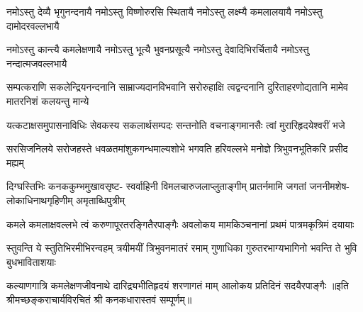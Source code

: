 \fourlineindentedshloka
{नमोऽस्तु देव्यै भृगुनन्दनायै}
{नमोऽस्तु विष्णोरुरसि स्थितायै}
{नमोऽस्तु लक्ष्म्यै कमलालयायै}
{नमोऽस्तु दामोदरवल्लभायै}

\fourlineindentedshloka
{नमोऽस्तु कान्त्यै कमलेक्षणायै}
{नमोऽस्तु भूत्यै भुवनप्रसूत्यै}
{नमोऽस्तु देवादिभिरर्चितायै}
{नमोऽस्तु नन्दात्मजवल्लभायै}

\fourlineindentedshloka
{सम्पत्कराणि सकलेन्द्रियनन्दनानि}
{साम्राज्यदानविभवानि सरोरुहाक्षि}
{त्वद्वन्दनानि दुरिताहरणोद्यतानि}
{मामेव मातरनिशं कलयन्तु मान्ये}

\fourlineindentedshloka
{यत्कटाक्षसमुपासनाविधिः}
{सेवकस्य सकलार्थसम्पदः}
{सन्तनोति वचनाङ्गमानसैः}
{त्वां मुरारिहृदयेश्वरीं भजे}

\fourlineindentedshloka
{सरसिजनिलये सरोजहस्ते}
{धवळतमांशुकगन्धमाल्यशोभे}
{भगवति हरिवल्लभे मनोज्ञे}
{त्रिभुवनभूतिकरि प्रसीद मह्यम्}

\fourlineindentedshloka
{दिग्घस्तिभिः कनककुम्भमुखावसृष्ट-}
{स्वर्वाहिनी विमलचारुजलाप्लुताङ्गीम्}
{प्रातर्नमामि जगतां जननीमशेष-}
{लोकाधिनाथगृहिणीम् अमृताब्धिपुत्रीम्}

\fourlineindentedshloka
{कमले कमलाक्षवल्लभे त्वं}
{करुणापूरतरङ्गितैरपाङ्गैः}
{अवलोकय मामकिञ्चनानां}
{प्रथमं पात्रमकृत्रिमं दयायाः}

\fourlineindentedshloka
{स्तुवन्ति ये स्तुतिभिरमीभिरन्वहम्}
{त्रयीमयीं त्रिभुवनमातरं रमाम्}
{गुणाधिका गुरुतरभाग्यभागिनो}
{भवन्ति ते भुवि बुधभाविताशयाः}

{कल्याणगात्रि कमलेक्षणजीवनाथे}
{दारिद्र्यभीतिहृदयं शरणागतं माम्}
{आलोकय प्रतिदिनं सदयैरपाङ्गैः}
॥इति  श्रीमच्छङ्कराचार्यविरचितं श्री कनकधारास्तवं सम्पूर्णम्॥